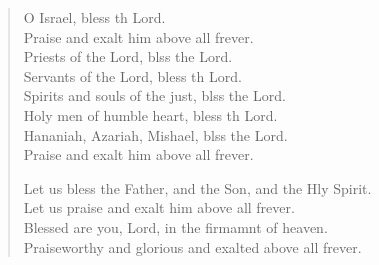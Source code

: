 \begin{verse}
\begin{patverse}
O Israel, bless th Lord.\Med\\
Praise and exalt him above all frever.\\
Priests of the Lord, blss the Lord.\Med\\
Servants of the Lord, bless th Lord.\\
Spirits and souls of the just, blss the Lord.\Med\\
Holy men of humble heart, bless th Lord.\\
Hananiah, Azariah, Mishael, blss the Lord.\Med\\
Praise and exalt him above all frever.

Let us bless the Father, and the Son, and the Hly Spirit.\Med\\
Let us praise and exalt him above all frever.\\
Blessed are you, Lord, in the firmamnt of heaven.\Med\\
Praiseworthy and glorious and exalted above all frever.
  \end{patverse}
\end{verse}

